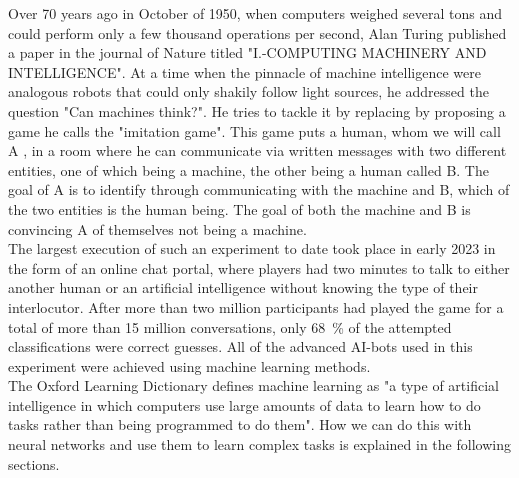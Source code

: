 Over 70 years ago in October of 1950, when computers weighed several tons and could perform only a few thousand operations per second, Alan Turing published a paper in the journal of Nature titled "I.-COMPUTING MACHINERY AND INTELLIGENCE"\cite{TuringThinkingPaper}. At a time when the pinnacle of machine intelligence were analogous robots that could only shakily follow light sources\cite{FirstThinkingMachinesArticle}, he addressed the question "Can machines think?". He tries to tackle it by replacing by proposing a game he calls the "imitation game". This game puts a human, whom we will call A , in a room where he can communicate via written messages with two different entities, one of which being a machine, the other being a human called B. The goal of A is to identify through communicating with the machine and B, which of the two entities is the human being. The goal of both the machine and B is convincing A of themselves not being a machine.\\
The largest execution of such an experiment to date took place in early 2023 in the form of an online chat portal, where players had two minutes to talk to either another human or an artificial intelligence without knowing the type of their interlocutor. After more than two million participants had played the game for a total of more than 15 million conversations, only \SI{68}{\percent} of the attempted classifications were correct guesses. All of the advanced AI-bots used in this experiment were achieved using machine learning methods.\\
The Oxford Learning Dictionary defines machine learning as "a type of artificial intelligence in which computers use large amounts of data to learn how to do tasks rather than being programmed to do them"\cite{MLDefinition}. How we can do this with neural networks and use them to learn complex tasks is explained in the following sections.

